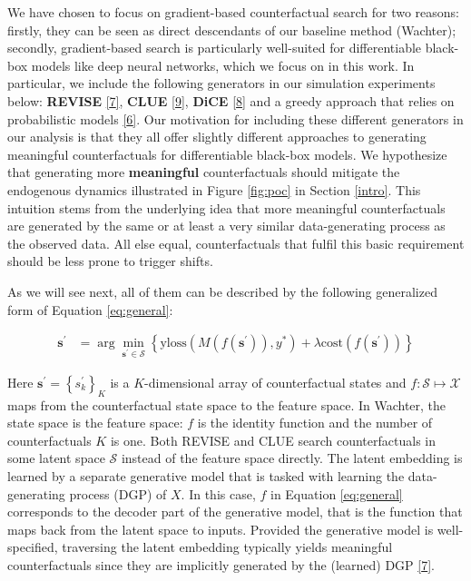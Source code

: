 \documentclass[conference,final,]{IEEEtran}
\theoremstyle{definition}
\theoremstyle{definition}
\theoremstyle{definition}
\theoremstyle{definition}
\theoremstyle{remark}
\begin{document}
We have chosen to focus on gradient-based counterfactual search for two reasons: firstly, they can be seen as direct descendants of our baseline method (Wachter); secondly, gradient-based search is particularly well-suited for differentiable black-box models like deep neural networks, which we focus on in this work. In particular, we include the following generators in our simulation experiments below: \textbf{REVISE} \protect\hyperlink{ref-joshi2019realistic}{{[}7{]}}, \textbf{CLUE} \protect\hyperlink{ref-antoran2020getting}{{[}9{]}}, \textbf{DiCE} \protect\hyperlink{ref-mothilal2020explaining}{{[}8{]}} and a greedy approach that relies on probabilistic models \protect\hyperlink{ref-schut2021generating}{{[}6{]}}. Our motivation for including these different generators in our analysis is that they all offer slightly different approaches to generating meaningful counterfactuals for differentiable black-box models. We hypothesize that generating more \textbf{meaningful} counterfactuals should mitigate the endogenous dynamics illustrated in Figure \ref{fig:poc} in Section \ref{intro}. This intuition stems from the underlying idea that more meaningful counterfactuals are generated by the same or at least a very similar data-generating process as the observed data. All else equal, counterfactuals that fulfil this basic requirement should be less prone to trigger shifts.

As we will see next, all of them can be described by the following generalized form of Equation \eqref{eq:general}:

\begin{equation}
\begin{aligned}
\mathbf{s}^\prime &= \arg \min_{\mathbf{s}^\prime \in \mathcal{S}} \left\{  {\text{yloss}(M(f(\mathbf{s}^\prime)),y^*)}+ \lambda {\text{cost}(f(\mathbf{s}^\prime)) }  \right\} \label{eq:general}
\end{aligned} 
\end{equation}

Here \(\mathbf{s}^\prime=\left\{s_k^\prime\right\}_K\) is a \(K\)-dimensional array of counterfactual states and \(f: \mathcal{S} \mapsto \mathcal{X}\) maps from the counterfactual state space to the feature space. In Wachter, the state space is the feature space: \(f\) is the identity function and the number of counterfactuals \(K\) is one. Both REVISE and CLUE search counterfactuals in some latent space \(\mathcal{S}\) instead of the feature space directly. The latent embedding is learned by a separate generative model that is tasked with learning the data-generating process (DGP) of \(X\). In this case, \(f\) in Equation \eqref{eq:general} corresponds to the decoder part of the generative model, that is the function that maps back from the latent space to inputs. Provided the generative model is well-specified, traversing the latent embedding typically yields meaningful counterfactuals since they are implicitly generated by the (learned) DGP \protect\hyperlink{ref-joshi2019realistic}{{[}7{]}}.
\end{document}
